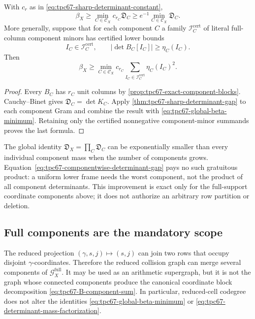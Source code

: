 \begin{corollary}
\label{cor:tpc67-componentwise-determinant-gap}
With \(c_r\) as in
\eqref{eq:tpc67-sharp-determinant-constant},
\begin{equation}
 \boxed{
 \beta_X
 \ge
 \min_{C\in\mathscr C_X}
 c_{r_C}\mathfrak D_C
 \ge
 e^{-1}\min_{C\in\mathscr C_X}\mathfrak D_C.}
 \label{eq:tpc67-componentwise-determinant-gap}
\end{equation}
More generally, suppose that for each component \(C\) a family
\(\mathscr I_C^{\mathrm{cert}}\) of literal full-column component minors has
certified lower bounds
\[
 I_C\in\mathscr I_C^{\mathrm{cert}},
 \qquad
 |\det B_C[I_C]|\ge\eta_C(I_C).
\]
Then
\begin{equation}
 \beta_X
 \ge
 \min_{C\in\mathscr C_X}
 c_{r_C}
 \sum_{I_C\in\mathscr I_C^{\mathrm{cert}}}\eta_C(I_C)^2.
 \label{eq:tpc67-componentwise-certified-mass}
\end{equation}
\end{corollary}

\begin{proof}
Every \(B_C\) has \(r_C\) unit columns by
\cref{prop:tpc67-exact-component-blocks}.  Cauchy--Binet gives
\(\mathfrak D_C=\det K_C\).  Apply
\cref{thm:tpc67-sharp-determinant-gap} to each component Gram and combine
the result with
\eqref{eq:tpc67-global-beta-minimum}.  Retaining only the certified
nonnegative component-minor summands proves the last formula.
\end{proof}

\begin{remark}
\label{rem:tpc67-componentwise-versus-product}
The global identity
\(\mathfrak D_X=\prod_C\mathfrak D_C\) can be exponentially smaller than
every individual component mass when the number of components grows.
Equation~\eqref{eq:tpc67-componentwise-determinant-gap} pays no such
gratuitous product: a uniform lower frame needs the worst component, not
the product of all component determinants.  This improvement is exact only
for the full-support coordinate components above; it does not authorize an
arbitrary row partition or deletion.
\end{remark}

\subsection{Full components are the mandatory scope}

The reduced projection
\((\gamma,s,j)\mapsto(s,j)\) can join two rows that occupy disjoint
\(\gamma\)-coordinates.  Therefore the reduced collision graph can merge
several components of \(\mathscr G_X^{\mathrm{full}}\).  It may be used as
an arithmetic supergraph, but it is not the graph whose connected
components produce the canonical coordinate block decomposition
\eqref{eq:tpc67-B-component-sum}.  In particular, reduced-cell codegree
does not alter the identities
\eqref{eq:tpc67-global-beta-minimum} or
\eqref{eq:tpc67-determinant-mass-factorization}.

